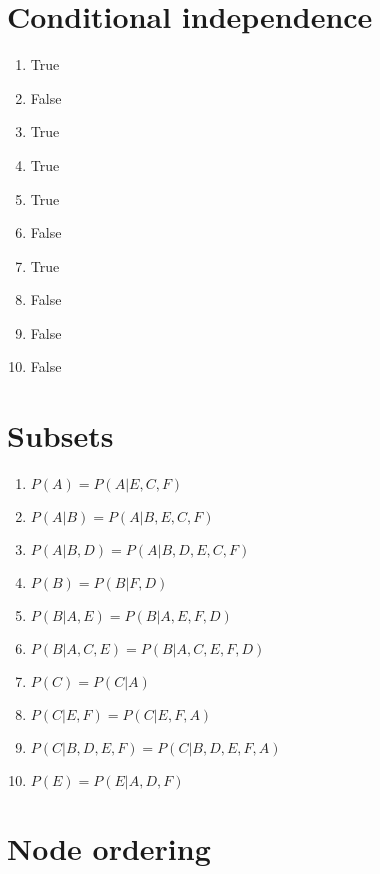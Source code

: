 \documentclass[]{article}
\begin{document}
\newpage
\section{Conditional independence}

\begin{enumerate}
  \item True
  \item False
  \item True
  \item True
  \item True
  \item False
  \item True
  \item False
  \item False
  \item False
\end{enumerate}

\section{Subsets}

\begin{enumerate}
  \item $P(A) = P(A|E,C,F)$
  \item $P(A|B) = P(A|B,E,C,F)$
  \item $P(A|B,D) = P(A|B,D,E,C,F)$
  \item $P(B) = P(B|F,D)$
  \item $P(B|A,E) = P(B|A,E,F,D)$
  \item $P(B|A,C,E) = P(B|A,C,E,F,D)$
  \item $P(C) = P(C|A)$
  \item $P(C|E,F) = P(C|E,F,A)$
  \item $P(C|B,D,E,F) = P(C|B,D,E,F,A)$
  \item $P(E) = P(E|A,D,F)$
\end{enumerate}

\newpage
\section{Node ordering}
\end{document}
